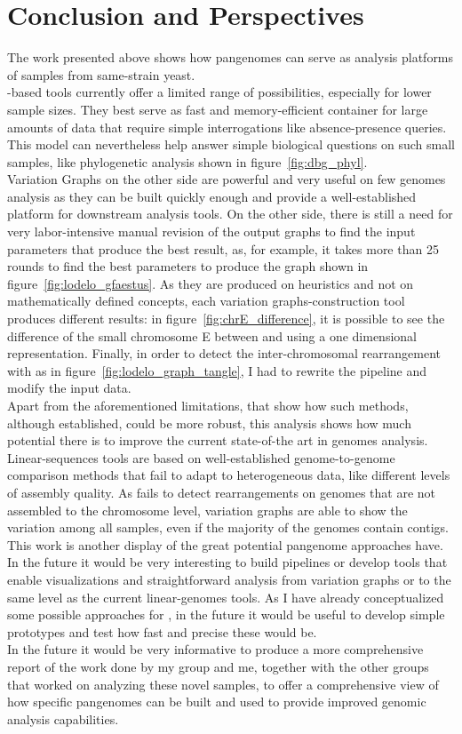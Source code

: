 \section{Conclusion and Perspectives}
The work presented above shows how pangenomes can serve as analysis platforms of samples from same-strain yeast. \\
\dbg-based tools currently offer a limited range of possibilities, especially for lower sample sizes. They best serve as fast and memory-efficient container for large amounts of data that require simple interrogations like absence-presence queries. This model can nevertheless help answer simple biological questions on such small samples, like phylogenetic analysis shown in figure~\ref{fig:dbg_phyl}.\\
Variation Graphs on the other side are powerful and very useful on few genomes analysis as they can be built quickly enough and provide a well-established platform for downstream analysis tools. On the other side, there is still a need for very labor-intensive manual revision of the output graphs to find the input parameters that produce the best result, as, for example, it takes more than 25 rounds to find the best \pggb parameters to produce the graph shown in figure~\ref{fig:lodelo_gfaestus}. As they are produced on heuristics and not on mathematically defined concepts, each variation graphs-construction tool produces different results: in figure~\ref{fig:chrE_difference}, it is possible to see the difference of the small chromosome E between \pggb and \mcactus using a one dimensional representation. Finally, in order to detect the inter-chromosomal rearrangement with \mcactus as in figure~\ref{fig:lodelo_graph_tangle}, I had to rewrite the pipeline and modify the input data. \\
Apart from the aforementioned limitations, that show how such methods, although established, could be more robust, this analysis shows how much potential there is to improve the current state-of-the art in genomes analysis. Linear-sequences tools are based on well-established genome-to-genome comparison methods that fail to adapt to heterogeneous data, like different levels of assembly quality. As \syri fails to detect rearrangements on genomes that are not assembled to the chromosome level, variation graphs are able to show the variation among all samples, even if the majority of the genomes contain contigs. \\
This work is another display of the great potential pangenome approaches have. In the future it would be very interesting to build pipelines or develop tools that enable visualizations and straightforward analysis from variation graphs or \ccdbgs to the same level as the current linear-genomes tools. As I have already conceptualized some possible approaches for \ccdbgs, in the future it would be useful to develop simple prototypes and test how fast and precise these would be.\\
In the future it would be very informative to produce a more comprehensive report of the work done by my group and me, together with the other groups that worked on analyzing these novel \lodelo samples, to offer a comprehensive view of how specific pangenomes can be built and used to provide improved genomic analysis capabilities.

